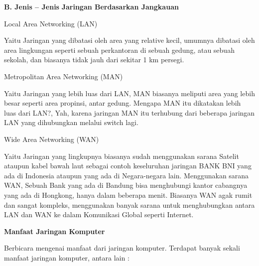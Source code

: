 \documentclass[a4paper,12pt]{report}
\begin{document}
 \par
\vspace{12pt}
\noindent 
\textbf{B. Jenis – Jenis}\textbf{ Jaringan Berdasarkan Jangkauan} \par
\noindent 
\begin{myEnumerate}
\item Local Area Networking (LAN) \par
Yaitu Jaringan yang dibatasi oleh area yang relative kecil, umumnya dibatasi oleh area lingkungan seperti sebuah perkantoran di sebuah gedung, atau sebuah sekolah, dan biasanya tidak jauh dari sekitar 1 km persegi. \par
\noindent 
\item Metropolitan Area Networking (MAN) \par
Yaitu Jaringan yang lebih luas dari LAN, MAN biasanya meliputi area yang lebih besar seperti area propinsi, antar gedung. Mengapa MAN itu dikatakan lebih luas dari LAN?, Yah, karena jaringan MAN itu terhubung dari beberapa jaringan LAN yang dihubungkan melalui switch lagi. \par
\vspace{12pt}
\noindent 
\item Wide Area Networking (WAN)\end{myEnumerate}
 \par
Yaitu Jaringan yang lingkupnya biasanya sudah menggunakan sarana Satelit ataupun kabel bawah laut sebagai contoh keseluruhan jaringan BANK BNI yang ada di Indonesia ataupun yang ada di Negara-negara lain. Menggunakan sarana WAN, Sebuah Bank yang ada di Bandung bisa menghubungi kantor cabangnya yang ada di Hongkong, hanya dalam beberapa menit. Biasanya WAN agak rumit dan sangat kompleks, menggunakan banyak sarana untuk menghubungkan antara LAN dan WAN ke dalam Komunikasi Global seperti Internet. \par
\vspace{12pt}
\noindent 
\textbf{Manfaat Jaringan Komputer} \par
Berbicara mengenai manfaat dari jaringan komputer. Terdapat banyak sekali manfaat jaringan komputer, antara lain : \par
\noindent 
\end{document}
